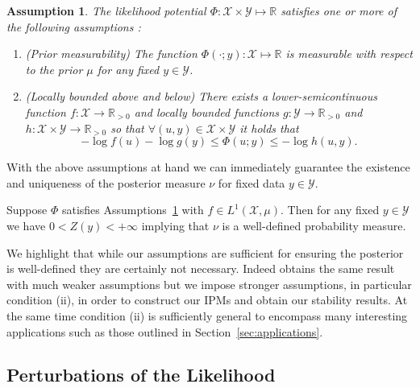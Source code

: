 \documentclass[final]{siamart171218}
\newtheorem{assumption}{Assumption}
\newcommand{\mcl}{\mathcal}
\newcommand{\mbb}{\mathbb}
\newcommand{\mX}{\mcl{X}}
\newcommand{\mY}{\mcl{Y}}
\begin{document}
\begin{assumption}\label{assumptions-on-phi}
  The likelihood potential $\Phi: \mX \times \mY \mapsto \mbb{R}$ satisfies one or more of the following 
  assumptions : 
\begin{enumerate}[label={(\roman*)}]

\item ({\it Prior measurability}) The function $\Phi(\cdot; y) : \mX \mapsto \mbb R$
  is measurable with respect to the prior $\mu$ for any fixed $y \in \mY$. 

 
\item ({\it Locally bounded  above and below}) There exists a
  lower-semicontinuous function
  $f: \mX \to \mbb{R}_{>0}$ and
  locally bounded functions $g: \mY \to \mbb{R}_{>0}$ and
  $h: \mX \times \mY \to \mbb{R}_{>0}$ so that
  $\forall (u,y) \in \mX \times \mY$
  it holds that
  \begin{equation*}
    -  \log f (u) - \log g(y)  \le \Phi(u;y) \le - \log h(u,y).
\end{equation*}

\end{enumerate}
\end{assumption}

With the above assumptions at hand we can immediately guarantee the existence and
uniqueness of the posterior measure $\nu$ for fixed data $y \in \mY$.


\begin{proposition}
  \label{well-defined-posterior}
  Suppose $\Phi$ satisfies Assumptions~\ref{assumptions-on-phi} with
  $f \in L^1(\mX, \mu)$.
  Then for any fixed $y \in \mY$
 we have
$0<Z(y)< + \infty$ implying that   
$\nu$ is a well-defined probability measure.
\end{proposition}

We highlight that while our assumptions are sufficient for ensuring the posterior is 
well-defined they are certainly not necessary. Indeed \cite{latz} obtains the same 
result with much weaker assumptions but we impose stronger assumptions, in particular 
condition (ii), in order to construct our IPMs and obtain our stability results.
At the same time condition (ii) is sufficiently general to encompass many interesting applications 
such as those outlined in Section~\ref{sec:applications}.


\subsection{Perturbations of the Likelihood}\label{sec:pert-likel}
\end{document}

